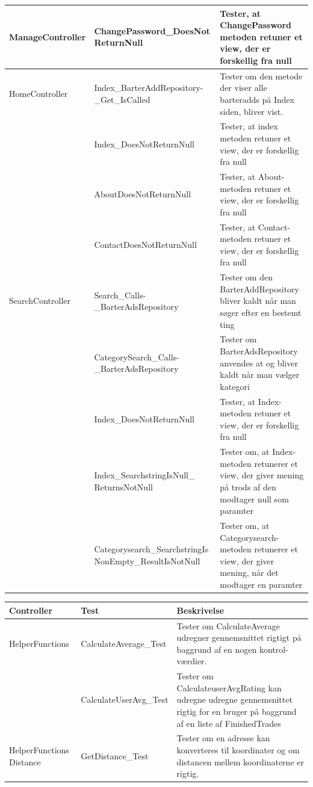 \begin{table}[H]
\begin{tabular}{ | p{3.0cm} | p{5.5cm} | p{8.0cm} | }
		ManageController & ChangePassword\_DoesNot
		ReturnNull &Tester, at ChangePassword metoden retuner et view, der er forskellig fra null\
		\\
		\hline
		HomeController & Index\_BarterAddRepository-\_Get\_IsCalled & Tester om den metode der viser alle barteradds på Index siden, bliver vist. \\
		& Index\_DoesNotReturnNull & Tester, at index metoden  retuner et view, der er forskellig fra null\\
		& AboutDoesNotReturnNull & Tester, at About-metoden  retuner et view, der er forskellig fra null \\
		& ContactDoesNotReturnNull &  Tester, at Contact-metoden retuner et view, der er forskellig fra null  \\
		\hline
		SearchController & Search\_Calls-\_BarterAdsRepository & Tester om den BarterAddRepository bliver kaldt når man søger efter en bestemt ting \\
		& CategorySearch\_Calls-\_BarterAdsRepository & Tester om BarterAdsRepository anvendes at og bliver kaldt når man vælger kategori \\
		& Index\_DoesNotReturnNull & Tester, at Index-metoden retuner et view, der er forskellig fra null\\
		& Index\_SearchstringIsNull\_
		ReturnsNotNull & Tester om, at Index-metoden retunerer et view, der giver mening på trods af  den modtager null som paramter\\
		& Categorysearch\_SearchstringIs
		NonEmpty\_ResultIsNotNull & Tester om, at Categorysearch-metoden retunerer et view, der giver mening, når det modtager en paramter\\
		\hline
		\end{tabular}
\end{table}

\setlength{\arrayrulewidth}{0.3mm}
\setlength{\tabcolsep}{2pt}
\renewcommand{\arraystretch}{1.5}
\begin{table}[H]
	\begin{tabular}{ | p{3.0cm} | p{5.5cm} | p{8.0cm} | }
		\hline
		\textbf{Controller} & \textbf{Test} & \textbf{Beskrivelse} \\
		\hline
		HelperFunctions & CalculateAverage\_Test & Tester om CalculateAverage udregner gennemsnittet rigtigt på baggrund af en nogen kontrol-værdier. \\ &  CalculateUserAvg\_Test & Tester om CalculateuserAvgRating kan udregne udregne gennemsnittet rigtig for en bruger på baggrund af en liste af FinishedTrades\\
		\hline
		HelperFunctions Distance & GetDistance\_Test & Tester om en adresse kan konverteres til koordinater og om distancen mellem koordinaterne er rigtig.\\
		\hline
	\end{tabular}
\end{table}

